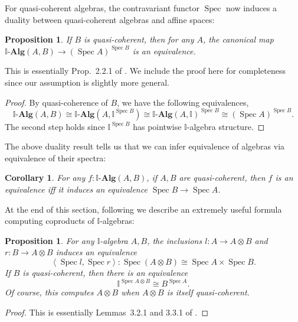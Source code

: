 \documentclass[a4paper,12pt]{amsart}
\newtheorem{corollary}[theorem]{Corollary}
\newtheorem{proposition}[theorem]{Proposition}
\theoremstyle{definition}
\newcommand{\mb}[1]{\mathbf{#1}}
\newcommand{\mbb}[1]{\mathbb{#1}}
\newcommand{\I}{\mbb I}
\newcommand{\alg}{\text{-}\mb{Alg}}
\newcommand{\pair}[1]{\left\langle#1\right\rangle}
\newcommand{\spec}{\operatorname{Spec}}
\begin{document}
For quasi-coherent algebras, the contravariant functor $\spec$ now induces a duality between quasi-coherent algebras and affine spaces:

\begin{proposition}\label{prop:duality}
  If $B$ is quasi-coherent, then for any $A$, the canonical map $\I\alg(A,B)\to (\spec A)^{\spec B}$ is an equivalence.
\end{proposition}
This is essentially Prop.~2.2.1 of \citet{Cherubini_Coquand_Hutzler_2024}. We include the proof here for completeness since our assumption is slightly more general.
\begin{proof}
 By quasi-coherence of $B$, we have the following equivalences,
  \[ \I\alg(A,B) \cong \I\alg(A,\I^{\spec B}) \cong \I\alg(A,\I)^{\spec B} \cong (\spec A)^{\spec B}. \]
  The second step holds since $\I^{\spec B}$ has pointwise $\I$-algebra structure.
\end{proof}

The above duality result tells us that we can infer equivalence of algebras via equivalence of their spectra:

\begin{corollary}\label{cor:dualityeqv}
  For any $f \colon \I\alg(A,B)$, if $A,B$ are quasi-coherent, then $f$ is an equivalence iff it induces an equivalence $\spec B \to \spec A$. 
\end{corollary}

At the end of this section, following \citet{Cherubini_Coquand_Hutzler_2024} we describe an extremely useful formula computing coproducts of $\I$-algebras:

\begin{proposition}\label{prop:tensorasspace}
  For any $\I$-algebra $A,B$, the inclusions $l \colon A \to A \otimes B$ and $r \colon B \to A \otimes B$ induces an equivalence
  \[ \pair{\spec l,\spec r} \colon \spec(A \otimes B) \cong \spec A \times \spec B. \]
  If $B$ is quasi-coherent, then there is an equivalence
  \[ \I^{\spec A \otimes B} \cong B^{\spec A}. \]
  Of course, this computes $A \otimes B$ when $A \otimes B$ is itself quasi-coherent.
\end{proposition}
\begin{proof}
  This is essentially Lemmas~3.2.1 and 3.3.1 of \citet{Cherubini_Coquand_Hutzler_2024}.
\end{proof}
\end{document}
